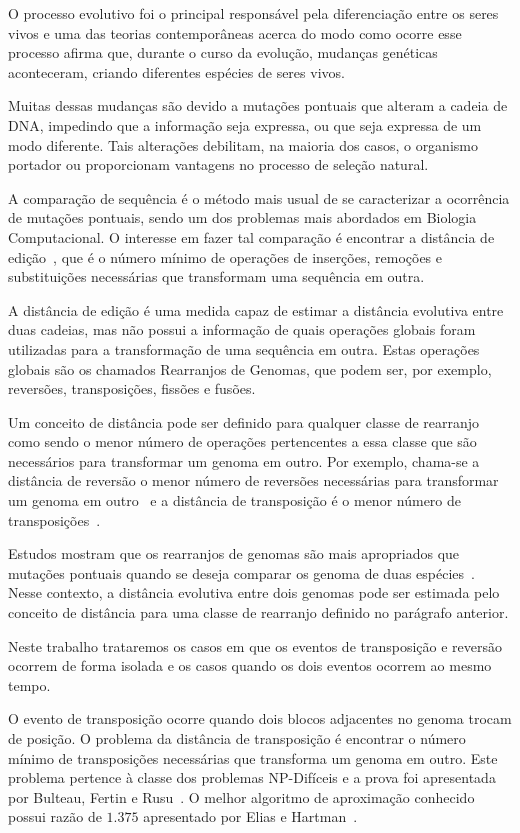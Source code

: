O processo evolutivo foi o principal responsável pela diferenciação
entre os seres vivos e uma das teorias contemporâneas acerca do modo
como ocorre esse processo afirma que, durante o curso da evolução,
mudanças genéticas aconteceram, criando diferentes espécies de seres
vivos.

Muitas dessas mudanças são devido a mutações pontuais que alteram a
cadeia de DNA, impedindo que a informação seja expressa, ou que seja
expressa de um modo diferente. Tais alterações debilitam, na maioria
dos casos, o organismo portador ou proporcionam vantagens no processo
de seleção natural.

A comparação de sequência é o método mais usual de se caracterizar a
ocorrência de mutações pontuais, sendo um dos problemas mais abordados
em Biologia Computacional. O interesse em fazer tal comparação é
encontrar a distância de edição~\cite{SetubalMeidanis*1997}, que é o
número mínimo de operações de inserções, remoções e substituições
necessárias que transformam uma sequência em outra.

A distância de edição é uma medida capaz de estimar a distância
evolutiva entre duas cadeias, mas não possui a informação de quais
operações globais foram utilizadas para a transformação de uma
sequência em outra. Estas operações globais são os chamados
Rearranjos de Genomas, que podem ser, por exemplo, reversões,
transposições, fissões e fusões.

Um conceito de distância pode ser definido para qualquer classe de
rearranjo como sendo o menor número de operações pertencentes a essa
classe que são necessários para transformar um genoma em outro. Por
exemplo, chama-se a distância de reversão o menor número de reversões
necessárias para transformar um genoma em
outro~\cite{BafnaPevzner*1996} e a distância de transposição é o menor
número de transposições~\cite{BafnaPevzner*1998}.

Estudos mostram que os rearranjos de genomas são mais apropriados que
mutações pontuais quando se deseja comparar os genoma de duas
espécies~\cite{PalmerHerbon*1988}. Nesse contexto, a distância
evolutiva entre dois genomas pode ser estimada pelo conceito de
distância para uma classe de rearranjo definido no parágrafo anterior.

Neste trabalho trataremos os casos em que os eventos de transposição e
reversão ocorrem de forma isolada e os casos quando os dois eventos
ocorrem ao mesmo tempo.

O evento de transposição ocorre quando dois blocos adjacentes no
genoma trocam de posição. O problema da distância de transposição é
encontrar o número mínimo de transposições necessárias que transforma
um genoma em outro. Este problema pertence à classe dos problemas
NP-Difíceis e a prova foi apresentada por Bulteau, Fertin e
Rusu~\cite{BulteauFertinRusu*2010}. O melhor algoritmo de aproximação
conhecido possui razão de $1.375$ apresentado por Elias e
Hartman~\cite{EliasHartman*2006}.


